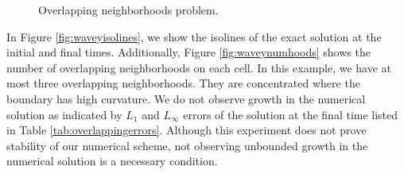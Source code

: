 \begin{figure}
\quad
{}
\caption{Overlapping neighborhoods problem.} \label{fig:overlappingneighborhoods}
\end{figure}

In Figure \ref{fig:waveyisolines}, we show the isolines of the exact solution at the initial and final times.  Additionally, Figure \ref{fig:waveynumhoods} shows the number of overlapping neighborhoods on each cell.  In this example, we have at most three overlapping neighborhoods.  They are concentrated where the boundary has high curvature.   We do not observe growth in the numerical solution as indicated by $L_1$ and $L_\infty$ errors of the solution at the final time listed in Table \ref{tab:overlappingerrors}.  Although this experiment does not prove stability of our numerical scheme, not observing unbounded growth in the numerical solution is a necessary condition.


